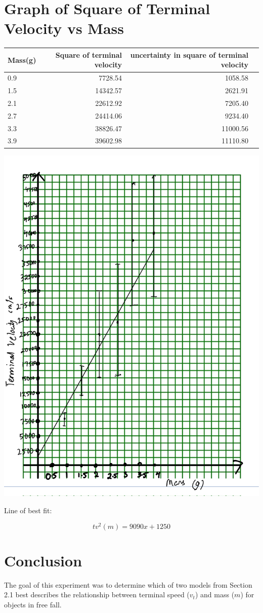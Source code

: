 \documentclass[12pt, letterpaper]{article}
\begin{document}
\section{Graph of Square of Terminal Velocity vs Mass}
\begin{table}[!htp]\centering
\scriptsize
\begin{tabular}{lrrr}\toprule
Mass(g) &Square of terminal velocity &uncertainty in square of terminal velocity \\\midrule
0.9 &7728.54 &1058.58 \\
1.5 &14342.57 &2621.91 \\
2.1 &22612.92 &7205.40 \\
2.7 &24414.06 &9234.40 \\
3.3 &38826.47 &11000.56 \\
3.9 &39602.98 &11110.80 \\
\bottomrule
\end{tabular}
\end{table}
\includegraphics[width=0.6\linewidth]{printable-quarter_inch_green_graph_paper-4x Copy.jpeg}

Line of best fit:

\[
tv^2(m) = 9090x + 1250
\]

\section{Conclusion}

The goal of this experiment was to determine which of two models from Section 2.1 best describes the relationship between terminal speed ($v_t$) and mass ($m$) for objects in free fall.
\end{document}
